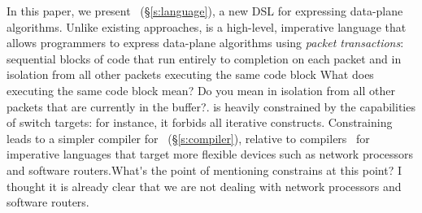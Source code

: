 




In this paper, we present \pktlanguage~(\S\ref{s:language}), a new DSL for
expressing data-plane algorithms. Unlike existing approaches, 
\pktlanguage is a high-level, imperative
language that allows programmers to express data-plane algorithms using {\em
packet transactions}: sequential blocks of code that run entirely 
to completion on each
packet and in isolation from all other packets executing the same code block
\ac{What does executing the same code block mean? Do you mean in isolation from
all other packets that are currently in the buffer?}.
\pktlanguage is heavily constrained by the capabilities of switch targets: for
instance, it forbids all iterative constructs. Constraining \pktlanguage leads
to a simpler compiler for \pktlanguage~(\S\ref{s:compiler}), relative to
compilers~\cite{ixp} for imperative languages that target more flexible devices
such as network processors and software routers.\ac{What's the point of 
mentioning constrains at this point? I thought it is already clear that we 
are not dealing with network processors and software routers.}

